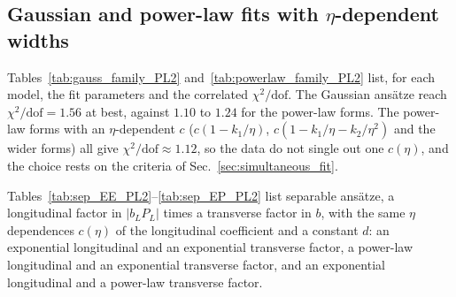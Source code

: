 \subsection{Gaussian and power-law fits with $\eta$-dependent widths}

Tables~\ref{tab:gauss_family_PL2} and~\ref{tab:powerlaw_family_PL2} list, for each model, the fit parameters and the correlated $\chi^2/\text{dof}$. The Gaussian ansätze reach $\chi^2/\text{dof}=1.56$ at best, against $1.10$ to $1.24$ for the power-law forms. The power-law forms with an $\eta$-dependent $c$ ($c(1-k_1/\eta)$, $c(1-k_1/\eta-k_2/\eta^2)$ and the wider forms) all give $\chi^2/\text{dof}\approx1.12$, so the data do not single out one $c(\eta)$, and the choice rests on the criteria of Sec.~\ref{sec:simultaneous_fit}.

Tables~\ref{tab:sep_EE_PL2}--\ref{tab:sep_EP_PL2} list separable ansätze, a longitudinal factor in $|b_LP_L|$ times a transverse factor in $b$, with the same $\eta$ dependences $c(\eta)$ of the longitudinal coefficient and a constant $d$: an exponential longitudinal and an exponential transverse factor, a power-law longitudinal and an exponential transverse factor, and an exponential longitudinal and a power-law transverse factor.






